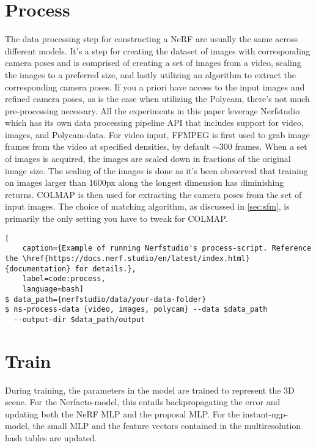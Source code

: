 \section{Process}
The data processing step for constructing a NeRF are usually the same across different models. It's a step for creating the dataset of images with corresponding camera poses and is comprised of creating a set of images from a video, scaling the images to a preferred size, and lastly utilizing an algorithm to extract the corresponding camera poses. If you a priori have access to the input images and refined camera poses, as is the case when utilizing the Polycam, there's not much pre-processing necessary. All the experiments in this paper leverage Nerfstudio which has its own data processing pipeline API that includes support for video, images, and Polycam-data. For video input, FFMPEG \cite{tomar2006converting} is first used to grab image frames from the video at specified densities, by default $\sim$300 frames. When a set of images is acquired, the images are scaled down in fractions of the original image size. The scaling of the images is done as it's been obeserved that training on images larger than 1600px along the longest dimension has diminishing returns. COLMAP is then used for extracting the camera poses from the set of input images. The choice of matching algorithm, as discussed in \autoref{sec:sfm}, is primarily the only setting you have to tweak for COLMAP.

\begin{lstlisting}[
    caption={Example of running Nerfstudio's process-script. Reference the \href{https://docs.nerf.studio/en/latest/index.html}{documentation} for details.},
    label=code:process,
    language=bash]
$ data_path={nerfstudio/data/your-data-folder}
$ ns-process-data {video, images, polycam} --data $data_path 
  --output-dir $data_path/output
\end{lstlisting}


\section{Train}
During training, the parameters in the model are trained to represent the 3D scene. For the Nerfacto-model, this entails backpropagating the error and updating both the NeRF MLP and the proposal MLP. For the instant-ngp-model, the small MLP and the feature vectors contained in the multiresolution hash tables are updated.

